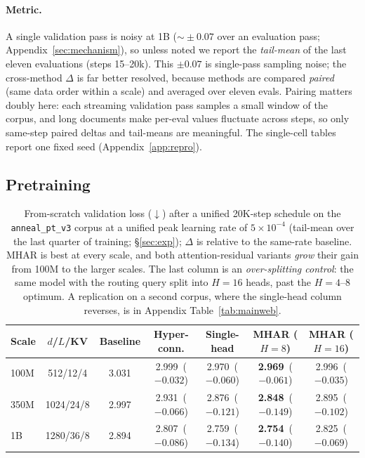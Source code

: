 \documentclass{article}
\begin{document}
\paragraph{Metric.} A single validation pass is noisy at 1B ($\sim\!\pm0.07$ over an
evaluation pass; Appendix~\ref{sec:mechanism}), so unless noted we report the
\emph{tail-mean} of the last eleven evaluations (steps 15--20k). This $\pm0.07$ is
single-pass sampling noise; the cross-method $\Delta$ is far better resolved,
because methods are compared \emph{paired} (same data order within a scale) and
averaged over eleven evals. Pairing matters doubly here: each streaming
validation pass samples a small window of the corpus, and long documents make
per-eval values fluctuate across steps, so only same-step paired deltas and
tail-means are meaningful. The
single-cell tables report one fixed seed (Appendix~\ref{app:repro}).

\subsection{Pretraining}

\begin{table}[h]
\centering
\caption{From-scratch validation loss ($\downarrow$) after a unified 20K-step
schedule on the \texttt{anneal\_pt\_v3} corpus at a unified peak learning rate
of $5\times10^{-4}$ (tail-mean over the last quarter of training;
\S\ref{sec:exp}); $\Delta$ is relative
to the same-rate baseline. MHAR is best at every scale, and both
attention-residual variants \emph{grow} their gain from 100M to the larger
scales. The last
column is an \emph{over-splitting control}: the same model with the routing
query split into $H{=}16$ heads, past the $H{=}4$--$8$ optimum. A replication on a
second corpus, where the single-head column reverses, is in Appendix
Table~\ref{tab:mainweb}.}
\label{tab:main}
\begin{tabular}{lcccccc}
\toprule
\textbf{Scale} & \textbf{$d$/$L$/KV} & \textbf{Baseline} & \textbf{Hyper-conn.} & \textbf{Single-head} & \textbf{MHAR ($H{=}8$)} & \textbf{MHAR ($H{=}16$)} \\
\midrule
100M & 512/12/4  & 3.031 & 2.999 \,($-0.032$) & 2.970 \,($-0.060$) & \textbf{2.969} \,($-0.061$) & 2.996 \,($-0.035$) \\
350M & 1024/24/8 & 2.997 & 2.931 \,($-0.066$) & 2.876 \,($-0.121$) & \textbf{2.848} \,($-0.149$) & 2.895 \,($-0.102$) \\
1B   & 1280/36/8 & 2.894 & 2.807 \,($-0.086$) & 2.759 \,($-0.134$) & \textbf{2.754} \,($-0.140$) & 2.825 \,($-0.069$) \\
\bottomrule
\end{tabular}
\end{table}
\end{document}
